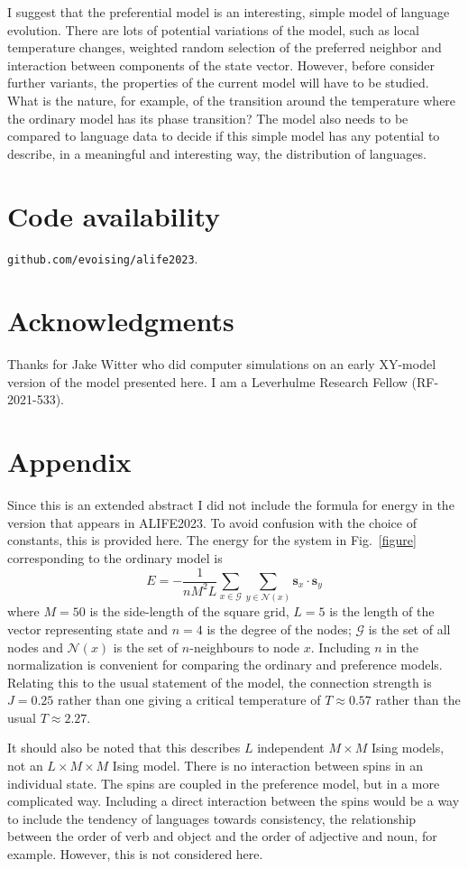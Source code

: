 \documentclass[letterpaper]{article}
\begin{document}
I suggest that the preferential model is an interesting, simple model of language evolution. There are lots of potential variations of the model, such as local temperature changes, weighted random selection of the preferred neighbor and interaction between components of the state vector. However, before consider further variants, the properties of the current model will have to be studied. What is the nature, for example, of the transition around the temperature where the ordinary model has its phase transition? The model also needs to be compared to language data to decide if this simple model has any potential to describe, in a meaningful and interesting way, the distribution of languages. 

\section{Code availability}
\texttt{github.com/evoising/alife2023}.
\section{Acknowledgments}
Thanks for Jake Witter who did computer simulations on an early XY-model version of the model presented here. I am a Leverhulme Research Fellow (RF-2021-533).
\newpage
\footnotesize
\section{Appendix}
Since this is an extended abstract I did not include the formula for energy in the version that appears in ALIFE2023. To avoid confusion with the choice of constants, this is provided here. The energy for the system in Fig.~\ref{figure} corresponding to the ordinary model is
\begin{equation}    
    E=-\frac{1}{nM^2L}\sum_{x\in \mathcal{G}}\sum_{y\in \mathcal{N}(x)} \textbf{s}_x\cdot\textbf{s}_y    
\end{equation}
where $M=50$ is the side-length of the square grid, $L=5$ is the length of the vector representing state and $n=4$ is the degree of the nodes; $\mathcal{G}$ is the set of all nodes and $\mathcal{N}(x)$ is the set of $n$-neighbours to node $x$. Including $n$ in the normalization is convenient for comparing the ordinary and preference models. Relating this to the usual statement of the model, the connection strength is $J=0.25$ rather than one giving a critical temperature of $T\approx 0.57$ rather than the usual $T\approx 2.27$. 

It should also be noted that this describes $L$ independent $M\times M$ Ising models, not an $L\times M\times M$ Ising model. There is no interaction between spins in an individual state. The spins are coupled in the preference model, but in a more complicated way. Including a direct interaction between the spins would be a way to include the tendency of languages towards consistency, the relationship between the order of verb and object and the order of adjective and noun, for example. However, this is not considered here. 
\end{document}
